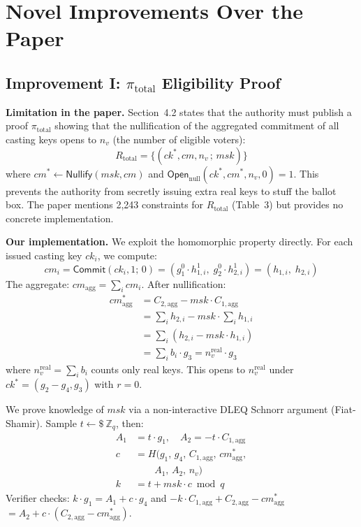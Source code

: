 \documentclass[conference]{IEEEtran}
\begin{document}
\section{Novel Improvements Over the Paper}
\label{sec:improvements}

\subsection{Improvement I: $\pi_{\text{total}}$ Eligibility Proof}

\textbf{Limitation in the paper.}
Section~4.2 states that the authority must publish a proof $\pi_{\text{total}}$
showing that the nullification of the aggregated commitment of all casting
keys opens to $n_v$ (the number of eligible voters):
\[
  R_{\text{total}} = \bigl\{(\mathit{ck}^*, \mathit{cm}, n_v\,;\, \mathit{msk})\bigr\}
\]
where $\mathit{cm}^* \leftarrow \mathsf{Nullify}(\mathit{msk}, \mathit{cm})$
and $\mathsf{Open}_{\mathrm{null}}(\mathit{ck}^*, \mathit{cm}^*, n_v, 0) = 1$.
This prevents the authority from secretly issuing extra real keys to stuff
the ballot box.  The paper mentions 2,243 constraints for $R_{\text{total}}$
(Table~3) but provides no concrete implementation.

\textbf{Our implementation.}
We exploit the homomorphic property directly.  For each issued casting key
$\mathit{ck}_i$, we compute:
\[
  \mathit{cm}_i = \mathsf{Commit}(\mathit{ck}_i, 1;\, 0)
  = (g_1^0 \cdot h_{1,i}^1,\; g_2^0 \cdot h_{2,i}^1)
  = (h_{1,i},\; h_{2,i})
\]
The aggregate: $\mathit{cm}_{\mathrm{agg}} = \sum_i \mathit{cm}_i$.
After nullification:
\begin{align*}
  \mathit{cm}^*_{\mathrm{agg}} &= C_{2,\text{agg}} - \mathit{msk}\cdot C_{1,\text{agg}}\\
  &= \textstyle\sum_i h_{2,i} - \mathit{msk}\cdot \sum_i h_{1,i}\\
  &= \textstyle\sum_i (h_{2,i} - \mathit{msk}\cdot h_{1,i})\\
  &= \textstyle\sum_i b_i \cdot g_3 = n_v^{\text{real}}\cdot g_3
\end{align*}
where $n_v^{\text{real}} = \sum_i b_i$ counts only real keys.  This opens
to $n_v^{\text{real}}$ under $\mathit{ck}^* = (g_2 - g_4, g_3)$ with $r=0$.

We prove knowledge of $\mathit{msk}$ via a non-interactive DLEQ Schnorr
argument (Fiat-Shamir).  Sample $t \leftarrow\!\!\!\$\ \mathbb{Z}_q$, then:
{\small
\begin{align*}
  A_1 &= t\cdot g_1,\quad A_2 = {-t}\cdot C_{1,\text{agg}}\\
  c &= H(g_1,\, g_4,\, C_{1,\text{agg}},\, \mathit{cm}^*_{\text{agg}},\\
    &\qquad A_1,\, A_2,\, n_v)\\
  k &= t + \mathit{msk}\cdot c \bmod q
\end{align*}
}
\noindent Verifier checks:
$k\cdot g_1 = A_1 + c\cdot g_4$
and
$-k\cdot C_{1,\text{agg}} + C_{2,\text{agg}} - \mathit{cm}^*_{\text{agg}}$
$= A_2 + c\cdot(C_{2,\text{agg}} - \mathit{cm}^*_{\text{agg}})$.
\end{document}
